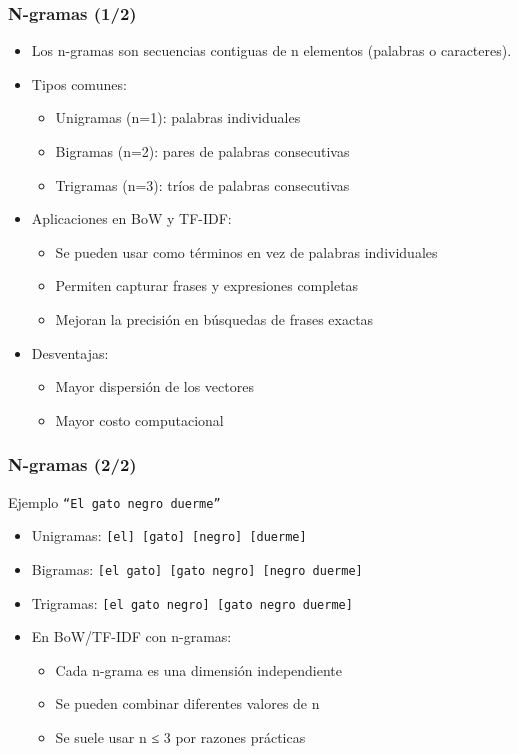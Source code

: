 \documentclass[handout]{beamer}
\begin{document}
\begin{frame}\frametitle{N-gramas (1/2)}
\begin{itemize}
 \item Los n-gramas son secuencias contiguas de n elementos (palabras o caracteres).
 \item Tipos comunes:
   \begin{itemize}
     \item Unigramas (n=1): palabras individuales
     \item Bigramas (n=2): pares de palabras consecutivas
     \item Trigramas (n=3): tríos de palabras consecutivas
   \end{itemize}
 \item Aplicaciones en BoW y TF-IDF:
   \begin{itemize}
     \item Se pueden usar como términos en vez de palabras individuales
     \item Permiten capturar frases y expresiones completas
     \item Mejoran la precisión en búsquedas de frases exactas
   \end{itemize}
 \item Desventajas:
   \begin{itemize}
    \item Mayor dispersión de los vectores
    \item Mayor costo computacional
   \end{itemize}
\end{itemize}
\end{frame}

\begin{frame}\frametitle{N-gramas (2/2)}
\begin{block}{Ejemplo}
  \vspace{0.5em}
  \texttt{``El gato negro duerme'' }
    \begin{itemize}
     \item Unigramas: \texttt{[el] [gato] [negro] [duerme]}
     \item Bigramas: \texttt{[el gato] [gato negro] [negro duerme]}
     \item Trigramas: \texttt{[el gato negro] [gato negro duerme]}
    \end{itemize}
\end{block}

\begin{itemize}
 \item En BoW/TF-IDF con n-gramas:
   \begin{itemize}
     \item Cada n-grama es una dimensión independiente
     \item Se pueden combinar diferentes valores de n
     \item Se suele usar n ≤ 3 por razones prácticas
   \end{itemize}
\end{itemize}
\end{frame}
\end{document}
